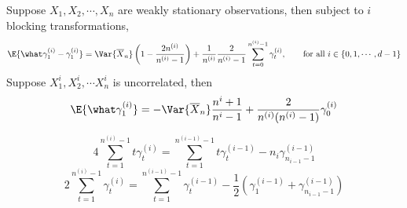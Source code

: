 \documentclass[11pt,english,a4paper]{article}
\begin{document}
\begin{prop*}
Suppose $X_1,X_2,\cdots,X_n$ are weakly stationary observations, then subject to $i$ blocking transformations,
\[
\E{ \what \gamma_1^{(i)} - \gamma_1^{(i)} } = \Var{\overline{X}_n}\left( 1 - \frac{2n^{(i)} }{n^{(i)} - 1} \right) + \frac{1}{n^{(i)}}\frac{2}{n^{(i)} - 1} \sum_{t=0}^{n^{(i)} - 1} \gamma_t^{(i)}, \qquad \text{for all $i \in \{0,1,\cdots,d-1\}$}
\]
Suppose $X_1^i, X_2^i, \cdots X_n^i$ is uncorrelated, then
\[
\E{ \what \gamma_1^{(i)} } = -\Var{\overline{X}_n} \frac{n^i + 1}{n^i -1} + \frac{2}{n^{(i)}(n^{(i)}-1) } \gamma^{(i)}_0
\]
\end{prop*}

\begin{prop}
\[
4 \sum_{t=1}^{n^{(i)} - 1} t \gamma_t^{(i)} = \sum_{t=1}^{n^{(i-1)} - 1} t \gamma_t^{(i-1)} - n_{i} \gamma_{n_{i-1} - 1}^{(i-1)}
\]
\[
2\sum_{t=1}^{n^{(i)} - 1} \gamma_t^{(i)} = \sum_{t=1}^{n^{(i-1)} - 1} \gamma_t^{(i-1)} - \frac{1}{2} \left( \gamma_{1}^{(i-1)} + \gamma_{n_{i-1} - 1}^{(i-1)} \right)
\]
\end{prop}
\end{document}
